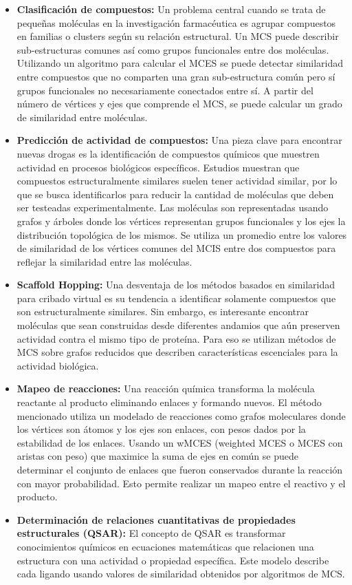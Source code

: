 \begin{itemize}
\item \textbf{Clasificación de compuestos:}
Un problema central cuando se trata de pequeñas moléculas en la investigación farmacéutica es agrupar compuestos en familias o clusters según su relación estructural. Un MCS puede describir sub-estructuras comunes así como grupos funcionales entre dos moléculas. Utilizando un algoritmo para calcular el MCES se puede detectar similaridad entre compuestos que no comparten una gran sub-estructura común pero sí grupos funcionales no necesariamente conectados entre sí. A partir del número de vértices y ejes que comprende el MCS, se puede calcular un grado de similaridad entre moléculas.

\item \textbf{Predicción de actividad de compuestos:}
Una pieza clave para encontrar nuevas drogas es la identificación de compuestos químicos que muestren actividad en procesos biológicos específicos. Estudios muestran que compuestos estructuralmente similares suelen tener actividad similar, por lo que se busca identificarlos para reducir la cantidad de moléculas que deben ser testeadas experimentalmente. Las moléculas son representadas usando grafos y árboles donde los vértices representan grupos funcionales y los ejes la distribución topológica de los mismos. Se utiliza un promedio entre los valores de similaridad de los vértices comunes del MCIS entre dos compuestos para reflejar la similaridad entre las moléculas.

\item \textbf{Scaffold Hopping:}
Una desventaja de los métodos basados en similaridad para cribado virtual es su tendencia a identificar solamente compuestos que son estructuralmente similares. Sin embargo, es interesante encontrar moléculas que sean construidas desde diferentes andamios que aún preserven actividad contra el mismo tipo de proteína. Para eso se utilizan métodos de MCS sobre grafos reducidos que describen características escenciales para la actividad biológica.

\item \textbf{Mapeo de reacciones:}
Una reacción química transforma la molécula reactante al producto eliminando enlaces y formando nuevos. El método mencionado utiliza un modelado de reacciones como grafos moleculares donde los vértices son átomos y los ejes son enlaces, con pesos dados por la estabilidad de los enlaces. Usando un wMCES (weighted MCES o MCES con aristas con peso) que maximice la suma de ejes en común se puede determinar el conjunto de enlaces que fueron conservados durante la reacción con mayor probabilidad. Esto permite realizar un mapeo entre el reactivo y el producto.

\item \textbf{Determinación de relaciones cuantitativas de propiedades estructurales (QSAR):}
El concepto de QSAR es transformar conocimientos químicos en ecuaciones matemáticas que relacionen una estructura con una actividad o propiedad específica. Este modelo describe cada ligando usando valores de similaridad obtenidos por algoritmos de MCS.

\end{itemize}

